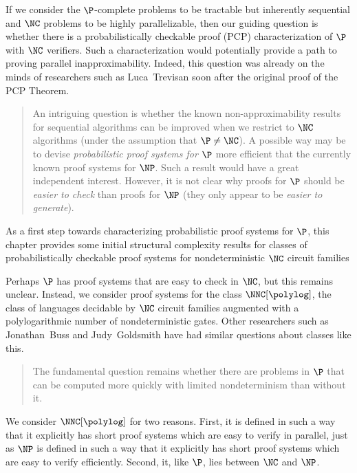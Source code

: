 If we consider the $\P$-complete problems to be tractable but inherently sequential and $\NC$ problems to be highly parallelizable, then our guiding question is whether there is a probabilistically checkable proof (PCP) characterization of $\P$ with $\NC$ verifiers.
Such a characterization would potentially provide a path to proving parallel inapproximability.
Indeed, this question was already on the minds of researchers such as Luca~Trevisan soon after the original proof of the PCP Theorem.
\begin{quote}
  An intriguing question is whether the known non-approximability results for sequential algorithms can be improved when we restrict to $\NC$ algorithms (under the assumption that $\P \neq \NC$).
  A possible way may be to devise \emph{probabilistic proof systems for $\P$} more efficient that the currently known proof systems for $\NP$.
  Such a result would have a great independent interest.
  However, it is not clear why proofs for $\P$ should be \emph{easier to check} than proofs for $\NP$ (they only appear to be \emph{easier to generate}).~\autocite{trevisan98}
\end{quote}
%
%
%
As a first step towards characterizing probabilistic proof systems for $\P$,
%
%
%
this chapter provides some initial structural complexity results for classes of probabilistically checkable proof systems for nondeterministic $\NC$ circuit families

%
%
%
%
Perhaps $\P$ has proof systems that are easy to check in $\NC$, but this remains unclear.
Instead, we consider proof systems for the class $\NNC[\polylog]$, the class of languages decidable by $\NC$ circuit families augmented with a polylogarithmic number of nondeterministic gates.
Other researchers such as Jonathan~Buss and Judy~Goldsmith have had similar questions about classes like this.
\begin{quote}
  The fundamental question remains whether there are problems in $\P$ that can be computed more quickly with limited nondeterminism than without it.~\autocite{bg93}
\end{quote}
We consider $\NNC[\polylog]$ for two reasons.
First, it is defined in such a way that it explicitly has short proof systems which are easy to verify in parallel, just as $\NP$ is defined in such a way that it explicitly has short proof systems which are easy to verify efficiently.
Second, it, like $\P$, lies between $\NC$ and $\NP$.

